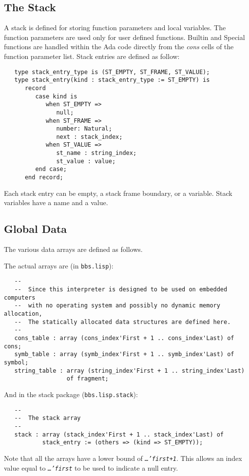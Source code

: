 \documentclass[10pt, openany]{book}
\newcommand{\package}[1]{\texttt{#1}}
\newcommand{\constant}[1]{\emph{\texttt{#1}}}
\begin{document}
\subsection{The Stack}
\label{sec:Stack}
A stack is defined for storing function parameters and local variables.  The function parameters are used only for user defined functions.  Builtin and Special functions are handled within the Ada code directly from the \emph{cons} cells of the function parameter list.  Stack entries are defined as follow:
\begin{lstlisting}
   type stack_entry_type is (ST_EMPTY, ST_FRAME, ST_VALUE);
   type stack_entry(kind : stack_entry_type := ST_EMPTY) is
      record
         case kind is
            when ST_EMPTY =>
               null;
            when ST_FRAME =>
               number: Natural;
               next : stack_index;
            when ST_VALUE =>
               st_name : string_index;
               st_value : value;
         end case;
      end record;
\end{lstlisting}
Each stack entry can be empty, a stack frame boundary, or a variable.  Stack variables have a name and a value.

\subsection{Global Data}
The various data arrays are defined as follows.

The actual arrays are (in \package{bbs.lisp}):
\begin{lstlisting}
   --
   --  Since this interpreter is designed to be used on embedded computers
   --  with no operating system and possibly no dynamic memory allocation,
   --  The statically allocated data structures are defined here.
   --
   cons_table : array (cons_index'First + 1 .. cons_index'Last) of cons;
   symb_table : array (symb_index'First + 1 .. symb_index'Last) of symbol;
   string_table : array (string_index'First + 1 .. string_index'Last)
                  of fragment;
\end{lstlisting}
And in the stack package (\package{bbs.lisp.stack}):
\begin{lstlisting}
   --
   --  The stack array
   --
   stack : array (stack_index'First + 1 .. stack_index'Last) of
           stack_entry := (others => (kind => ST_EMPTY));
\end{lstlisting}
Note that all the arrays have a lower bound of \constant{\ldots'first+1}.  This allows an index value equal to \constant{\ldots'first} to be used to indicate a null entry.
\end{document}

